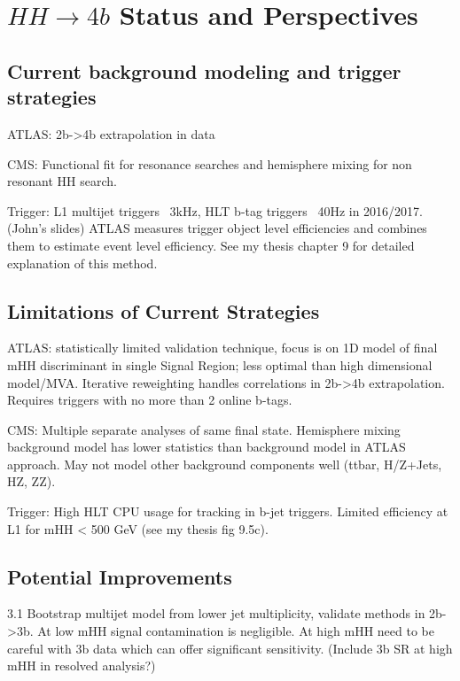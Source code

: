 \newcommand*{\ifb}{fb$^{-1}$ }
\newcommand*{\smhh}{SM $HH$ }

\section{$HH \to 4b$ Status and Perspectives}
\label{sec:HH4b}

\subsection{Current background modeling and trigger strategies}

ATLAS: 2b->4b extrapolation in data

CMS: Functional fit for resonance searches and hemisphere mixing for non resonant HH search.

Trigger: L1 multijet triggers ~3kHz, HLT b-tag triggers ~40Hz in 2016/2017. (John’s slides) ATLAS measures trigger object level efficiencies and combines them to estimate event level efficiency. See my thesis chapter 9 for detailed explanation of this method.

\subsection{Limitations of Current Strategies}

ATLAS: statistically limited validation technique, focus is on 1D model of final mHH discriminant in single Signal Region; less optimal than high dimensional model/MVA.  Iterative reweighting handles correlations in 2b->4b extrapolation. Requires triggers with no more than 2 online b-tags.

CMS: Multiple separate analyses of same final state. Hemisphere mixing background model has lower statistics than background model in ATLAS approach. May not model other background components well (ttbar, H/Z+Jets, HZ, ZZ).

Trigger: High HLT CPU usage for tracking in b-jet triggers. Limited efficiency at L1 for mHH < 500 GeV (see my thesis fig 9.5c).

\subsection{Potential Improvements}

3.1 Bootstrap multijet model from lower jet multiplicity, validate methods in 2b->3b. At low mHH signal contamination is negligible. At high mHH need to be careful with 3b data which can offer significant sensitivity. (Include 3b SR at high mHH in resolved analysis?)

